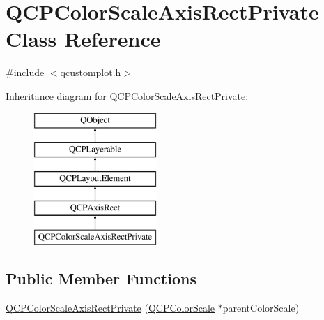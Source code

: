\hypertarget{class_q_c_p_color_scale_axis_rect_private}{}\section{Q\+C\+P\+Color\+Scale\+Axis\+Rect\+Private Class Reference}
\label{class_q_c_p_color_scale_axis_rect_private}


{\ttfamily \#include $<$qcustomplot.\+h$>$}

Inheritance diagram for Q\+C\+P\+Color\+Scale\+Axis\+Rect\+Private\+:\begin{figure}[H]
\begin{center}
\leavevmode
\includegraphics[height=5.000000cm]{df/ddc/class_q_c_p_color_scale_axis_rect_private}
\end{center}
\end{figure}
\subsection*{Public Member Functions}
\begin{DoxyCompactItemize}
\item 
\mbox{\hyperlink{class_q_c_p_color_scale_axis_rect_private_ad3b242f75dd2b33581364a4e668a80db}{Q\+C\+P\+Color\+Scale\+Axis\+Rect\+Private}} (\mbox{\hyperlink{class_q_c_p_color_scale}{Q\+C\+P\+Color\+Scale}} $\ast$parent\+Color\+Scale)
\end{DoxyCompactItemize}
